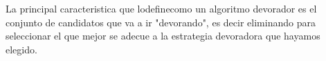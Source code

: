 La principal caracteristica que lodefinecomo un algoritmo devorador es el conjunto de candidatos que 
va a ir "devorando", es decir eliminando para seleccionar el que mejor se adecue a la estrategia devoradora
que hayamos elegido.